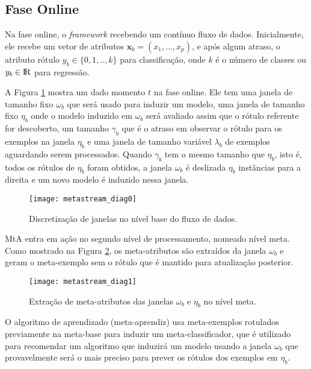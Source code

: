 \subsection{Fase Online}
\label{subsec:online}

Na fase online, o \textit{framework} recebendo um contínuo fluxo de dados. Inicialmente, ele recebe um vetor de atributos $\boldsymbol{x}_b = (x_1,...,x_p)$, e após algum atraso, o atributo rótulo $y_b \in \{0,1,..,k\}$ para classificação, onde $k$ é o número de classes ou $y_b \in \rm{I\!R}$ para regressão.

A Figura \ref{fig:ms_diagram0} mostra um dado momento $t$ na fase online. Ele tem uma janela de tamanho fixo $\omega_b$ que será usado para induzir um modelo, uma janela de tamanho fixo $\eta_b$ onde o modelo induzido em $\omega_b$ será avaliado assim que o rótulo referente for descoberto, um tamanho $\gamma_b$ que é o atraso em observar o rótulo para os exemplos na janela $\eta_b$ e uma janela de tamanho variável $\lambda_b$ de exemplos aguardando serem processados.
Quando $\gamma_b$ tem o mesmo tamanho que $\eta_b$, isto é, todos os rótulos de $\eta_b$ foram obtidos, a janela $\omega_b$ é deslizada $\eta_b$ instâncias para a direita e um novo modelo é induzido nessa janela.

\begin{figure}[ht]
    \centering
    \texttt{[image: metastream\_diag0]}
    \caption{Discretização de janelas no nível base do fluxo de dados.}
    \label{fig:ms_diagram0}
\end{figure}

MtA entra em ação no segundo nível de processamento, nomeado nível meta. Como mostrado na Figura \ref{fig:ms_diagram1}, os meta-atributos são extraídos da janela $\omega_b$ e geram o meta-exemplo sem o rótulo que é mantido para atualização posterior.

\begin{figure}[ht]
    \centering
    \texttt{[image: metastream\_diag1]}
    \caption{Extração de meta-atributos das janelas  $\omega_b$ e $\eta_b$ no nível meta.}
    \label{fig:ms_diagram1}
\end{figure}

O algoritmo de aprendizado (meta-aprendiz) usa meta-exemplos rotulados previamente na meta-base para induzir um meta-classificador, que é utilizado para recomendar um algoritmo que induzirá um modelo usando a janela $\omega_b$ que provavelmente será o mais preciso para prever os rótulos dos exemplos em $\eta_b$.
 












